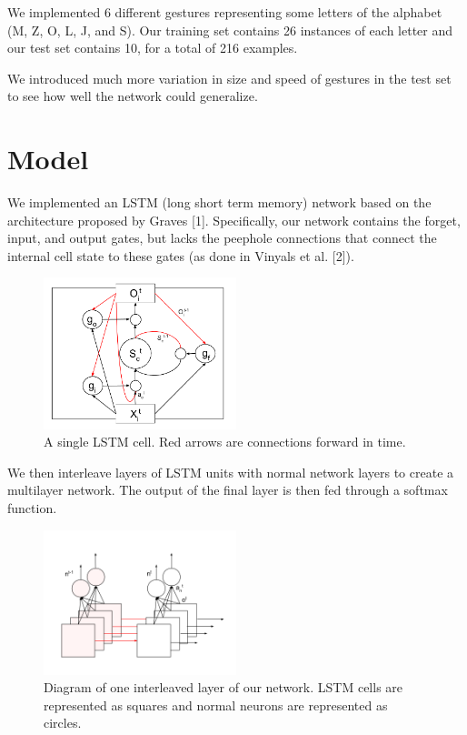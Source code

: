 \documentclass[11pt]{article}
\begin{document}
We implemented 6 different gestures representing some letters of
the alphabet (M, Z, O, L, J, and S). Our training set contains
26 instances of each letter and our test set contains 10, for
a total of 216 examples. 

We introduced much more variation in size and speed of gestures
in the test set to see how well the network could generalize.

\section{Model}
\label{sect:pdf}

We implemented an LSTM (long short term memory) network based on
the architecture proposed by Graves [1]. Specifically,
our network contains the forget, input, and output gates, but lacks the
peephole connections that connect the internal cell state to these gates
(as done in Vinyals et al. [2]).

\begin{figure}[ht]
\caption{A single LSTM cell. Red arrows are connections forward in time.}
  \centering
    \includegraphics[width=0.5\textwidth]{lstm_cell}
\end{figure}

We then interleave layers of LSTM units with
normal network layers to create a multilayer network.
The output of the final layer is then fed through a softmax function.

\begin{figure}[ht]
\caption{Diagram of one interleaved layer of our network. LSTM 
cells are represented as squares and normal neurons are represented
as circles.}
  \centering
    \includegraphics[width=0.5\textwidth]{lstm_network}
\end{figure}
\end{document}
